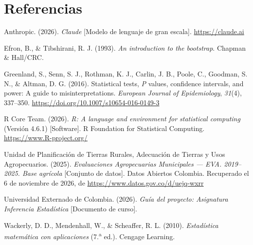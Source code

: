 \section{Referencias}
\vspace{6pt}

\begin{referencias}

\item Anthropic. (2026). \textit{Claude} [Modelo de lenguaje de gran escala]. \url{https://claude.ai}

\item Efron, B., \& Tibshirani, R. J. (1993). \textit{An introduction to the bootstrap}. Chapman \& Hall/CRC.

\item Greenland, S., Senn, S. J., Rothman, K. J., Carlin, J. B., Poole, C., Goodman, S. N., \& Altman, D. G. (2016). Statistical tests, \textit{P} values, confidence intervals, and power: A guide to misinterpretations. \textit{European Journal of Epidemiology}, \textit{31}(4), 337--350. \url{https://doi.org/10.1007/s10654-016-0149-3}

\item R Core Team. (2026). \textit{R: A language and environment for statistical computing} (Versión 4.6.1) [Software]. R Foundation for Statistical Computing. \url{https://www.R-project.org/}

\item Unidad de Planificación de Tierras Rurales, Adecuación de Tierras y Usos Agropecuarios. (2025). \textit{Evaluaciones Agropecuarias Municipales --- EVA. 2019--2025. Base agrícola} [Conjunto de datos]. Datos Abiertos Colombia. Recuperado el 6 de noviembre de 2026, de \url{https://www.datos.gov.co/d/uejq-wxrr}

\item Universidad Externado de Colombia. (2026). \textit{Guía del proyecto: Asignatura Inferencia Estadística} [Documento de curso].

\item Wackerly, D. D., Mendenhall, W., \& Scheaffer, R. L. (2010). \textit{Estadística matemática con aplicaciones} (7.\textsuperscript{a} ed.). Cengage Learning.

\end{referencias}
